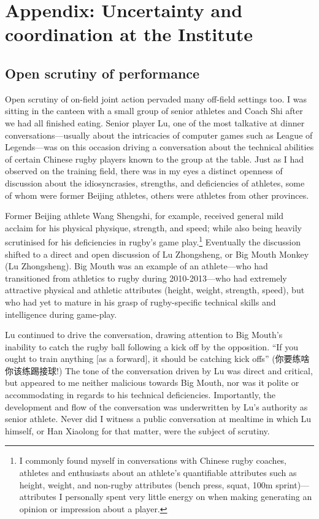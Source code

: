 \chapter{\label{app5:ethnoField}Appendix: Uncertainty and coordination at the Institute}

  \begin{CJK}{UTF8}{gbsn}




\section{Open scrutiny of performance\label{app5:openScrutinyLZS}}

Open scrutiny of on-field joint action pervaded many off-field settings too.  I was sitting in the canteen with a small group of senior athletes and Coach Shi after we had all finished eating.  Senior player Lu, one of the most talkative at dinner conversations---usually about the intricacies of computer games such as League of Legends---was on this occasion driving a conversation about the technical abilities of certain Chinese rugby players known to the group at the table.  Just as I had observed on the training field, there was in my eyes a distinct openness of discussion about the idiosyncrasies, strengths, and deficiencies of athletes, some of whom were former Beijing athletes, others were athletes from other provinces.

Former Beijing athlete Wang Shengshi, for example, received general mild acclaim for his physical physique, strength, and speed; while also being heavily scrutinised for his deficiencies in rugby's game play.\footnote{I commonly found myself in conversations with Chinese rugby coaches, athletes and enthusiasts about an athlete's quantifiable attributes such as height, weight, and non-rugby attributes (bench press, squat, 100m sprint)---attributes I personally spent very little energy on when making generating an opinion or impression about a player.}  Eventually the discussion shifted to a direct and open discussion of Lu Zhongsheng, or Big Mouth Monkey (Lu Zhongsheng).  Big Mouth was an example of an athlete---who had transitioned from athletics to rugby during 2010-2013---who had extremely attractive physical and athletic attributes (height, weight, strength, speed), but who had yet to mature in his grasp of rugby-specific technical skills and intelligence during game-play.

Lu continued to drive the conversation, drawing attention to Big Mouth's inability to catch the rugby ball following a kick off by the opposition. ``If you ought to train anything [as a forward], it should be catching kick offs'' (你要练啥你该练踢接球!)  The tone of the conversation driven by Lu was direct and critical, but appeared to me neither malicious towards Big Mouth, nor was it polite or accommodating in regards to his technical deficiencies.  Importantly, the development and flow of the conversation was underwritten by Lu's authority as senior athlete.  Never did I witness a public conversation at mealtime in which Lu himself, or Han Xiaolong for that matter, were the subject of scrutiny.


\end{CJK}
